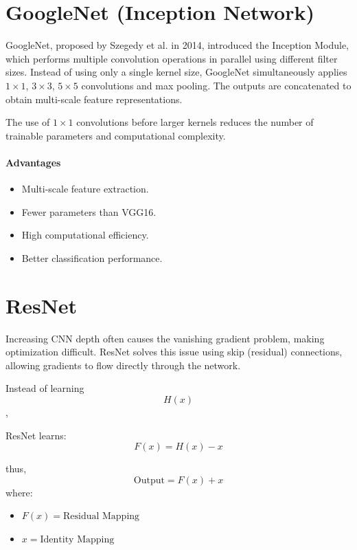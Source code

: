 \documentclass[11pt]{article}
\begin{document}
\section{GoogleNet (Inception Network)}
GoogleNet, proposed by Szegedy et al. in 2014, introduced the Inception Module, which performs multiple convolution operations in parallel using different filter sizes. Instead of using only a single kernel size, GoogleNet simultaneously applies $1 \times 1$, $3 \times 3$, $5 \times 5$ convolutions and max pooling. The outputs are concatenated to obtain multi-scale feature representations.

The use of $1 \times 1$ convolutions before larger kernels reduces the number of trainable parameters and computational complexity.

\paragraph{Advantages}
\begin{itemize}[leftmargin=*]
    \item Multi-scale feature extraction.
    \item Fewer parameters than VGG16.
    \item High computational efficiency.
    \item Better classification performance.
\end{itemize}
\newpage
\section{ResNet}
Increasing CNN depth often causes the vanishing gradient problem, making optimization difficult. ResNet solves this issue using skip (residual) connections, allowing gradients to flow directly through the network.

Instead of learning 
\[
H(x)
\], 

ResNet learns:
\[
F(x) = H(x) - x
\]

thus,
\[
\text{Output} = F(x) + x
\]
where:
\begin{itemize}[leftmargin=*]
    \item $F(x) = \text{Residual Mapping}$
    \item $x = \text{Identity Mapping}$
\end{itemize}
\end{document}
